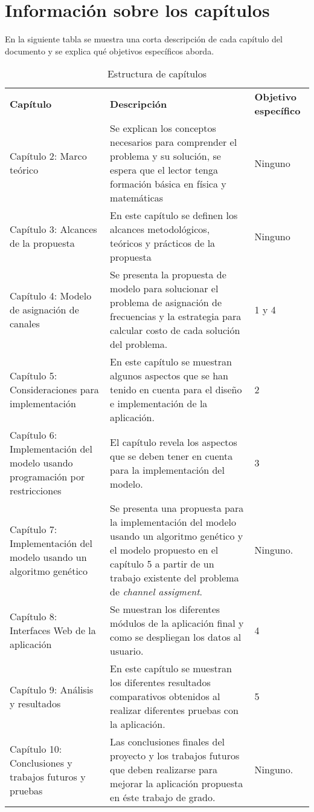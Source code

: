 \section{Información sobre los capítulos}

En la siguiente tabla se muestra una corta descripción de cada capítulo del documento y se explica qué objetivos específicos aborda.  


\begin{longtable}{|p{4.5cm}|p{8.5cm}|p{2.5cm}|}
\caption{Estructura de capítulos} \\
\cline{1-3} 
\cellcolor[gray]{0.9} \textbf{Capítulo} & \cellcolor[gray]{0.9}

\textbf{Descripción} &  \cellcolor[gray]{0.9}\textbf{Objetivo específico}\\
\cline{1-3}
Capítulo 2: {Marco teórico} & {Se explican los conceptos necesarios para comprender el problema y su solución, se espera que el lector tenga formación básica en física y matemáticas} & {Ninguno}\\
\cline{1-3}
Capítulo 3: {Alcances de la propuesta} & {En este capítulo se definen los alcances metodológicos, teóricos y prácticos de la propuesta} & {Ninguno}\\
\cline{1-3}
Capítulo 4: {Modelo de asignación de canales} & {Se presenta la propuesta de modelo para solucionar el problema de asignación de frecuencias y la estrategia para calcular costo de cada solución del problema.} & 1 y 4\\
\cline{1-3}
Capítulo 5: {Consideraciones para implementación} & {En este capítulo se muestran algunos aspectos que se han tenido en cuenta para el diseño e implementación de la aplicación.} &  2\\
\cline{1-3}
Capítulo 6: {Implementación del modelo usando programación por restricciones} & {El capítulo revela los aspectos que se deben tener en cuenta para la implementación del modelo.} &  3\\
\cline{1-3}
Capítulo 7: {Implementación del modelo usando un algoritmo genético} & {Se presenta una propuesta para la implementación del modelo usando un algoritmo genético y el modelo propuesto en el capítulo 5 a partir de un trabajo existente del problema de \textit{channel assigment}.}  & {Ninguno.}\\
\cline{1-3}
Capítulo 8: {Interfaces Web de la aplicación} & {Se muestran los diferentes módulos de la aplicación final y como se despliegan los datos al usuario.} &  4\\
\cline{1-3}
Capítulo 9: {Análisis y resultados} & {En este capítulo se muestran los diferentes resultados comparativos obtenidos al realizar diferentes pruebas con la aplicación.} &  5\\
\cline{1-3}
Capítulo 10: {Conclusiones y trabajos futuros y pruebas} & {Las conclusiones finales del proyecto y los trabajos futuros que deben realizarse para mejorar la aplicación propuesta en éste trabajo de grado.} & Ninguno.\\
\cline{1-3}
\end{longtable}
